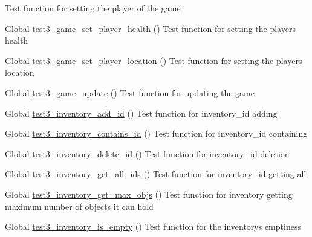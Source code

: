 \begin{DoxyRefList}
%
Test function for setting the player of the game  
\item[Global \mbox{\hyperlink{game__test_8c_a3f88dd50ae1c291d6320d5641acdd931}{test3\+\_\+game\+\_\+set\+\_\+player\+\_\+health}} ()]\label{test__test000169}%
%
Test function for setting the player\textquotesingle{}s health  
\item[Global \mbox{\hyperlink{game__test_8c_a53b01a4a49cc8739f36bd23a2648642a}{test3\+\_\+game\+\_\+set\+\_\+player\+\_\+location}} ()]\label{test__test000164}%
%
Test function for setting the player\textquotesingle{}s location  
\item[Global \mbox{\hyperlink{game__test_8c_a6cd456a4f2fdd65c76858fee06959555}{test3\+\_\+game\+\_\+update}} ()]\label{test__test000145}%
%
Test function for updating the game  
\item[Global \mbox{\hyperlink{inventory__test_8c_adb75e7f71748feea51900c782343f550}{test3\+\_\+inventory\+\_\+add\+\_\+id}} ()]\label{test__test000420}%
%
Test function for inventory\+\_\+id adding  
\item[Global \mbox{\hyperlink{inventory__test_8c_a72ab72e1ac407f383f9b54bde7d4757b}{test3\+\_\+inventory\+\_\+contains\+\_\+id}} ()]\label{test__test000432}%
%
Test function for inventory\+\_\+id containing  
\item[Global \mbox{\hyperlink{inventory__test_8c_a3dc930ea10c0e538e9f7227d5a7cdfa1}{test3\+\_\+inventory\+\_\+delete\+\_\+id}} ()]\label{test__test000425}%
%
Test function for inventory\+\_\+id deletion  
\item[Global \mbox{\hyperlink{inventory__test_8c_a9d0c5a60c64a4379870c193309f0f938}{test3\+\_\+inventory\+\_\+get\+\_\+all\+\_\+ids}} ()]\label{test__test000436}%
%
Test function for inventory\+\_\+id getting all  
\item[Global \mbox{\hyperlink{inventory__test_8c_a2f84a56b01ad51431c4db33b16078ae6}{test3\+\_\+inventory\+\_\+get\+\_\+max\+\_\+objs}} ()]\label{test__test000443}%
%
Test function for inventory getting maximum number of objects it can hold  
\item[Global \mbox{\hyperlink{inventory__test_8c_a9c8daeb141dbec6ddd5621edade53091}{test3\+\_\+inventory\+\_\+is\+\_\+empty}} ()]\label{test__test000417}%
%
Test function for the inventory\textquotesingle{}s emptiness  

\end{DoxyRefList}
